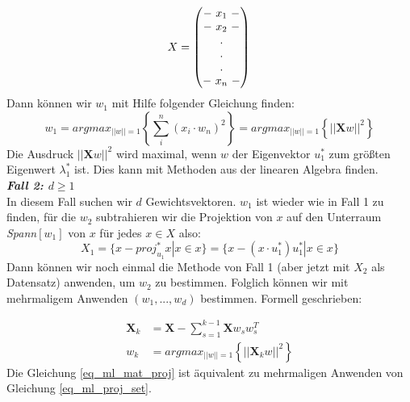 \begin{equation}
    X = \begin{pmatrix}
        - ~x_1~ -\\
        - ~ x_2 ~ - \\
        .\\.\\.\\
        -~x_n~-
        \end{pmatrix}\\
\end{equation}
Dann können wir $w_1$ mit Hilfe folgender Gleichung finden: 
\begin{equation}
    w_1 = argmax_{||w|| = 1}\left\{ \sum_i^n (x_i\cdot w_n)^2 \right\}= argmax_{||w|| = 1} \left\{||\textbf{X}w||^2\right\}
\end{equation}
Die Ausdruck $||\textbf{X}w||^2$ wird maximal, wenn $w$ der Eigenvektor $u_1^*$ zum größten Eigenwert $\lambda_1^*$ ist. Dies kann mit Methoden aus der linearen Algebra finden. \\

\textbf{\textit{Fall 2: $d \geq 1$}}\\

In diesem Fall suchen wir $d$ Gewichtsvektoren. $w_1$ ist wieder wie in Fall 1 zu finden, für die $w_2$ subtrahieren wir die Projektion von $x$ auf den Unterraum \textit{Spann}{$[w_1]$} von $x$ für jedes $x \in X $ also:
\begin{equation}
    X_1 = \{x - proj_{u_1}^* x | x \in x\} = \{x - (x \cdot u_1^*)u_1^* | x \in x\}
    \label{eq_ml_proj_set}
\end{equation}
Dann können wir noch einmal die Methode von Fall 1 (aber jetzt mit $X_2$ als Datensatz) anwenden, um $w_2$ zu bestimmen. Folglich können wir mit mehrmaligem Anwenden $(w_1,...,w_d)$ bestimmen. Formell geschrieben:

\begin{align}
    \textbf{X}_k &= \textbf{X} - \sum_{s=1}^{k-1} \textbf{X}w_s w_s^T\\ \label{eq_ml_mat_proj}
    w_k &=  argmax_{||w|| = 1} \left\{||\textbf{X}_k w||^2\right\}
\end{align}
Die Gleichung \ref{eq_ml_mat_proj} ist äquivalent zu mehrmaligen Anwenden von Gleichung \ref{eq_ml_proj_set}.
